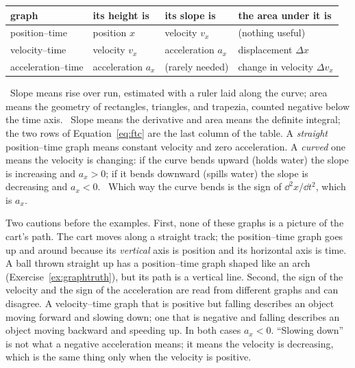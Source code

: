 \begin{keyidea}
\begin{center}
\renewcommand{\arraystretch}{1.4}
\small
\begin{tabular}{llll}
\toprule
graph & its height is & its slope is & the area under it is \\
\midrule
position--time & position $x$ & velocity $v_x$ & (nothing useful) \\
velocity--time & velocity $v_x$ & acceleration $a_x$ & displacement $\Delta x$ \\
acceleration--time & acceleration $a_x$ & (rarely needed) & change in velocity $\Delta v_x$ \\
\bottomrule
\end{tabular}
\end{center}
\elemtag\ Slope means rise over run, estimated with a ruler laid along the curve; area means the geometry of rectangles, triangles, and trapezia, counted negative below the time axis. \calctag\ Slope means the derivative and area means the definite integral; the two rows of Equation~\eqref{eq:ftc} are the last column of the table. A \emph{straight} position--time graph means constant velocity and zero acceleration. A \emph{curved} one means the velocity is changing: if the curve bends upward (holds water) the slope is increasing and $a_x > 0$; if it bends downward (spills water) the slope is decreasing and $a_x < 0$. \calctag\ Which way the curve bends is the sign of $\dd^2 x/\dd t^2$, which is $a_x$.
\end{keyidea}

Two cautions before the examples. First, none of these graphs is a picture of the cart's path. The cart moves along a straight track; the position--time graph goes up and around because its \emph{vertical} axis is position and its horizontal axis is time. A ball thrown straight up has a position--time graph shaped like an arch (Exercise~\ref{ex:graphtruth}), but its path is a vertical line. Second, the sign of the velocity and the sign of the acceleration are read from different graphs and can disagree. A velocity--time graph that is positive but falling describes an object moving forward and slowing down; one that is negative and falling describes an object moving backward and speeding up. In both cases $a_x < 0$. ``Slowing down'' is not what a negative acceleration means; it means the velocity is decreasing, which is the same thing only when the velocity is positive.

